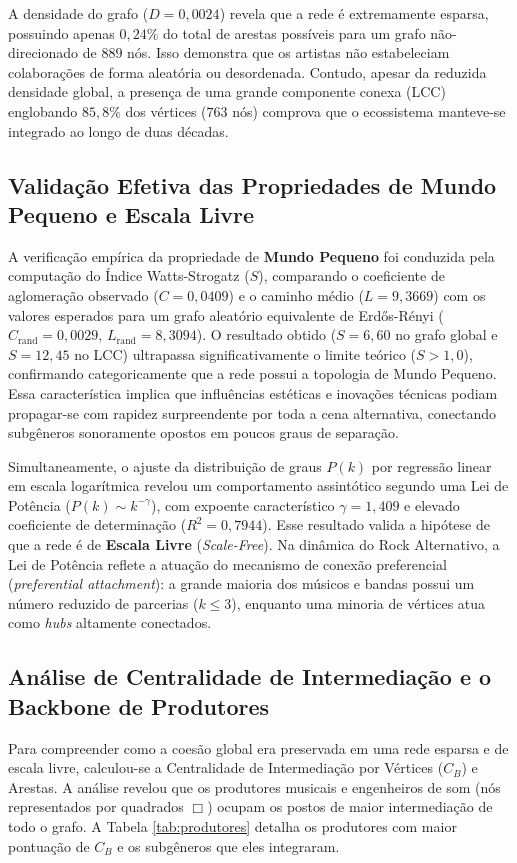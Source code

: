 \documentclass[conference]{IEEEtran}
\begin{document}
A densidade do grafo ($D = 0,0024$) revela que a rede é extremamente esparsa, possuindo apenas $0,24\%$ do total de arestas possíveis para um grafo não-direcionado de $889$ nós. Isso demonstra que os artistas não estabeleciam colaborações de forma aleatória ou desordenada. Contudo, apesar da reduzida densidade global, a presença de uma grande componente conexa (LCC) englobando $85,8\%$ dos vértices ($763$ nós) comprova que o ecossistema manteve-se integrado ao longo de duas décadas.

\subsection{Validação Efetiva das Propriedades de Mundo Pequeno e Escala Livre}
A verificação empírica da propriedade de \textbf{Mundo Pequeno} foi conduzida pela computação do Índice Watts-Strogatz ($S$), comparando o coeficiente de aglomeração observado ($C = 0,0409$) e o caminho médio ($L = 9,3669$) com os valores esperados para um grafo aleatório equivalente de Erdős-Rényi ($C_{\text{rand}} = 0,0029$, $L_{\text{rand}} = 8,3094$). O resultado obtido ($S = 6,60$ no grafo global e $S = 12,45$ no LCC) ultrapassa significativamente o limite teórico ($S > 1,0$), confirmando categoricamente que a rede possui a topologia de Mundo Pequeno. Essa característica implica que influências estéticas e inovações técnicas podiam propagar-se com rapidez surpreendente por toda a cena alternativa, conectando subgêneros sonoramente opostos em poucos graus de separação.

Simultaneamente, o ajuste da distribuição de graus $P(k)$ por regressão linear em escala logarítmica revelou um comportamento assintótico segundo uma Lei de Potência ($P(k) \sim k^{-\gamma}$), com expoente característico $\gamma = 1,409$ e elevado coeficiente de determinação ($R^2 = 0,7944$). Esse resultado valida a hipótese de que a rede é de \textbf{Escala Livre} (\textit{Scale-Free}). Na dinâmica do Rock Alternativo, a Lei de Potência reflete a atuação do mecanismo de conexão preferencial (\textit{preferential attachment}): a grande maioria dos músicos e bandas possui um número reduzido de parcerias ($k \le 3$), enquanto uma minoria de vértices atua como \textit{hubs} altamente conectados.

\subsection{Análise de Centralidade de Intermediação e o Backbone de Produtores}
Para compreender como a coesão global era preservada em uma rede esparsa e de escala livre, calculou-se a Centralidade de Intermediação por Vértices ($C_B$) e Arestas. A análise revelou que os produtores musicais e engenheiros de som (nós representados por quadrados $\Box$) ocupam os postos de maior intermediação de todo o grafo. A Tabela \ref{tab:produtores} detalha os produtores com maior pontuação de $C_B$ e os subgêneros que eles integraram.
\end{document}
